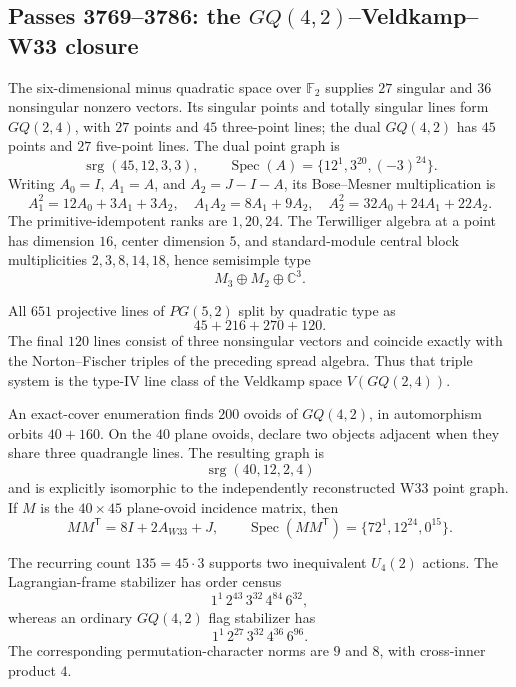 \subsection{Passes 3769--3786: the $GQ(4,2)$--Veldkamp--W33 closure}
\label{sec:bt3769-3786-gq-veldkamp}

The six-dimensional minus quadratic space over $\mathbb F_2$ supplies $27$ singular and $36$ nonsingular nonzero vectors.  Its singular points and totally singular lines form $GQ(2,4)$, with $27$ points and $45$ three-point lines; the dual $GQ(4,2)$ has $45$ points and $27$ five-point lines.  The dual point graph is
\[
 \operatorname{srg}(45,12,3,3),
 \qquad
 \operatorname{Spec}(A)=\{12^1,3^{20},(-3)^{24}\}.
\]
Writing $A_0=I$, $A_1=A$, and $A_2=J-I-A$, its Bose--Mesner multiplication is
\[
 A_1^2=12A_0+3A_1+3A_2,
 \quad
 A_1A_2=8A_1+9A_2,
 \quad
 A_2^2=32A_0+24A_1+22A_2.
\]
The primitive-idempotent ranks are $1,20,24$.  The Terwilliger algebra at a point has dimension $16$, center dimension $5$, and standard-module central block multiplicities $2,3,8,14,18$, hence semisimple type
\[
 M_3\oplus M_2\oplus \mathbb C^3.
\]

All $651$ projective lines of $PG(5,2)$ split by quadratic type as
\[
 45+216+270+120.
\]
The final $120$ lines consist of three nonsingular vectors and coincide exactly with the Norton--Fischer triples of the preceding spread algebra.  Thus that triple system is the type-IV line class of the Veldkamp space $V(GQ(2,4))$.

An exact-cover enumeration finds $200$ ovoids of $GQ(4,2)$, in automorphism orbits $40+160$.  On the $40$ plane ovoids, declare two objects adjacent when they share three quadrangle lines.  The resulting graph is
\[
 \operatorname{srg}(40,12,2,4)
\]
and is explicitly isomorphic to the independently reconstructed W33 point graph.  If $M$ is the $40\times45$ plane-ovoid incidence matrix, then
\[
 MM^{\mathsf T}=8I+2A_{W33}+J,
 \qquad
 \operatorname{Spec}(MM^{\mathsf T})=\{72^1,12^{24},0^{15}\}.
\]

The recurring count $135=45\cdot3$ supports two inequivalent $U_4(2)$ actions.  The Lagrangian-frame stabilizer has order census
\[
 1^1\,2^{43}\,3^{32}\,4^{84}\,6^{32},
\]
whereas an ordinary $GQ(4,2)$ flag stabilizer has
\[
 1^1\,2^{27}\,3^{32}\,4^{36}\,6^{96}.
\]
The corresponding permutation-character norms are $9$ and $8$, with cross-inner product $4$.

